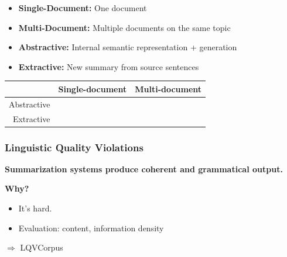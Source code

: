 \documentclass[table]{beamer}
\begin{document}
\begin{frame}

  \begin{itemize}
    \item \textbf{Single-Document:} One document
    \item \textbf{Multi-Document:} Multiple documents on the same topic
  \end{itemize}
  \pause
  \begin{itemize}
    \item \textbf{Abstractive:} Internal semantic representation + generation
    \item \textbf{Extractive:} New summary from source sentences
  \end{itemize}
  \pause
  \vspace{1cm}

  \quad \quad \quad \begin{tabular}{r|c|c|}
    & Single-document & Multi-document\\
    \hline
    Abstractive & \cellcolor{red!25} & \cellcolor{red!25}\\
    \hline
    Extractive & \cellcolor{red!25} & \cellcolor{green!25}\\
    \hline
  \end{tabular}
\end{frame}

\begin{frame}
  \frametitle{Linguistic Quality Violations}
  \textbf{Summarization systems  produce coherent and grammatical output.}
  \pause

  \textbf{Why?}
  \begin{itemize}
    \item It's hard.\pause
    \item Evaluation: content, information density
  \end{itemize}
  \vspace{1cm}
  \pause
  $\Rightarrow$ LQVCorpus \citep{friedrichlqvsumm}


\end{frame}
\end{document}
